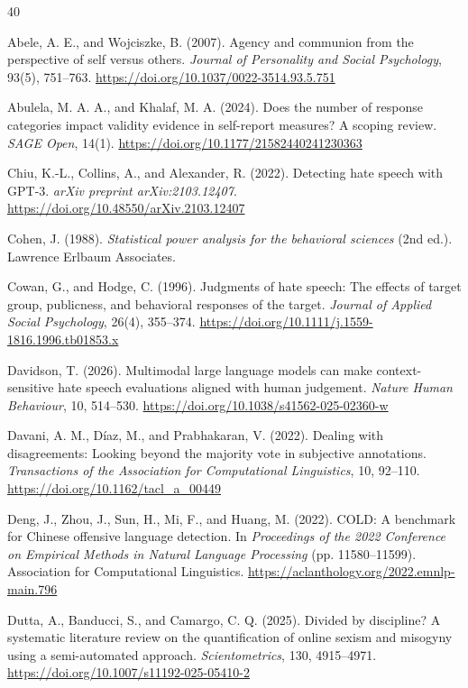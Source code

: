 \documentclass[a4paper,fleqn,review]{cas-sc}
\begin{document}
\begin{thebibliography}{40}

Abele, A. E., and Wojciszke, B. (2007).
Agency and communion from the perspective of self versus others.
\emph{Journal of Personality and Social Psychology}, 93(5), 751--763.
\url{https://doi.org/10.1037/0022-3514.93.5.751}

Abulela, M. A. A., and Khalaf, M. A. (2024).
Does the number of response categories impact validity evidence in self-report measures? A scoping review.
\emph{SAGE Open}, 14(1).
\url{https://doi.org/10.1177/21582440241230363}

Chiu, K.-L., Collins, A., and Alexander, R. (2022).
Detecting hate speech with GPT-3.
\emph{arXiv preprint arXiv:2103.12407}.
\url{https://doi.org/10.48550/arXiv.2103.12407}

Cohen, J. (1988).
\emph{Statistical power analysis for the behavioral sciences} (2nd ed.).
Lawrence Erlbaum Associates.

Cowan, G., and Hodge, C. (1996).
Judgments of hate speech: The effects of target group, publicness, and behavioral responses of the target.
\emph{Journal of Applied Social Psychology}, 26(4), 355--374.
\url{https://doi.org/10.1111/j.1559-1816.1996.tb01853.x}

Davidson, T. (2026).
Multimodal large language models can make context-sensitive hate speech evaluations aligned with human judgement.
\emph{Nature Human Behaviour}, 10, 514--530.
\url{https://doi.org/10.1038/s41562-025-02360-w}

Davani, A. M., D\'iaz, M., and Prabhakaran, V. (2022).
Dealing with disagreements: Looking beyond the majority vote in subjective annotations.
\emph{Transactions of the Association for Computational Linguistics}, 10, 92--110.
\url{https://doi.org/10.1162/tacl_a_00449}

Deng, J., Zhou, J., Sun, H., Mi, F., and Huang, M. (2022).
COLD: A benchmark for Chinese offensive language detection.
In \emph{Proceedings of the 2022 Conference on Empirical Methods in Natural Language Processing} (pp. 11580--11599).
Association for Computational Linguistics.
\url{https://aclanthology.org/2022.emnlp-main.796}

Dutta, A., Banducci, S., and Camargo, C. Q. (2025).
Divided by discipline? A systematic literature review on the quantification of online sexism and misogyny using a semi-automated approach.
\emph{Scientometrics}, 130, 4915--4971.
\url{https://doi.org/10.1007/s11192-025-05410-2}


\end{thebibliography}
\end{document}
